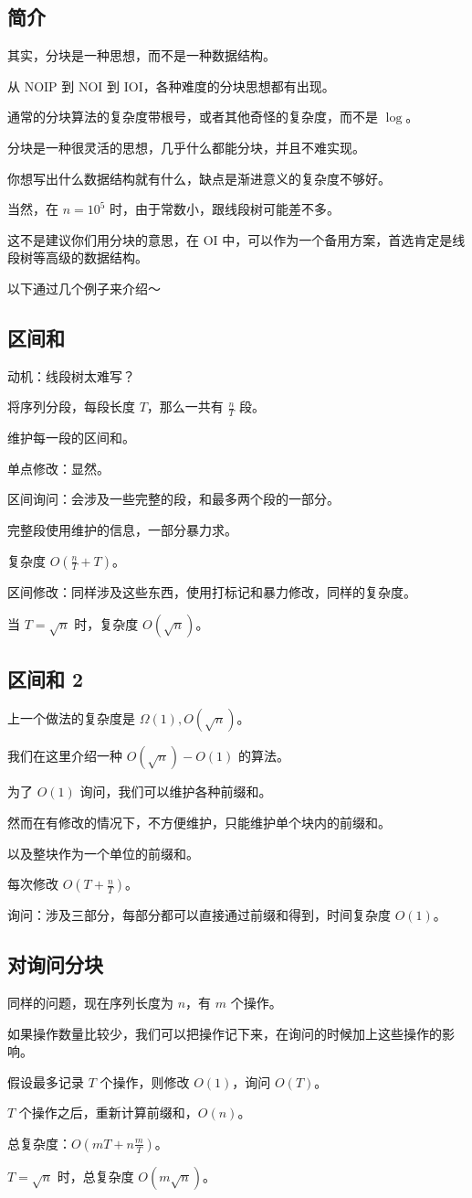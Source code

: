 
\subsection{简介}

其实，分块是一种思想，而不是一种数据结构。

从 NOIP 到 NOI 到 IOI，各种难度的分块思想都有出现。

通常的分块算法的复杂度带根号，或者其他奇怪的复杂度，而不是 $\log$。

分块是一种很灵活的思想，几乎什么都能分块，并且不难实现。

你想写出什么数据结构就有什么，缺点是渐进意义的复杂度不够好。

当然，在 $n=10^5$ 时，由于常数小，跟线段树可能差不多。

这不是建议你们用分块的意思，在 OI 中，可以作为一个备用方案，首选肯定是线段树等高级的数据结构。

以下通过几个例子来介绍～

\subsection{区间和}

动机：线段树太难写？

将序列分段，每段长度 $T$，那么一共有 $\frac{n}{T}$ 段。

维护每一段的区间和。

单点修改：显然。

区间询问：会涉及一些完整的段，和最多两个段的一部分。

完整段使用维护的信息，一部分暴力求。

复杂度 $O(\frac{n}{T}+T)$。

区间修改：同样涉及这些东西，使用打标记和暴力修改，同样的复杂度。

当 $T=\sqrt{n}$ 时，复杂度 $O(\sqrt{n})$。

\subsection{区间和 2}

上一个做法的复杂度是 $\Omega(1) , O(\sqrt{n})$。

我们在这里介绍一种 $O(\sqrt{n}) - O(1)$ 的算法。

为了 $O(1)$ 询问，我们可以维护各种前缀和。

然而在有修改的情况下，不方便维护，只能维护单个块内的前缀和。

以及整块作为一个单位的前缀和。

每次修改 $O(T+\frac{n}{T})$。

询问：涉及三部分，每部分都可以直接通过前缀和得到，时间复杂度 $O(1)$。

\subsection{对询问分块}

同样的问题，现在序列长度为 $n$，有 $m$ 个操作。

如果操作数量比较少，我们可以把操作记下来，在询问的时候加上这些操作的影响。

假设最多记录 $T$ 个操作，则修改 $O(1)$，询问 $O(T)$。

$T$ 个操作之后，重新计算前缀和，$O(n)$。

总复杂度：$O(mT+n\frac{m}{T})$。

$T=\sqrt{n}$ 时，总复杂度 $O(m \sqrt{n})$。
